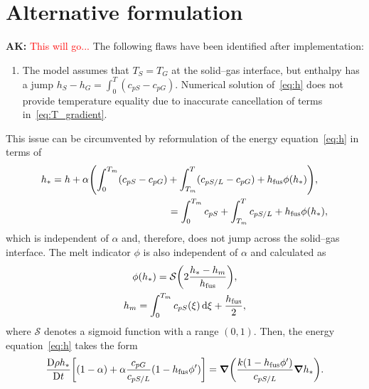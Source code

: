 \documentclass[final]{elsarticle} %
\newcommand\Dv[2][]{\frac{\mathrm{D}#1}{\mathrm{D}#2}}
\newcommand{\fusion}[1]{{#1}_\text{fus}}
\newcommand{\ak}[1] {\textbf{AK:} \textcolor{red}{#1}}
\begin{document}
\section{Alternative formulation}

\ak{This will go... } The following flaws have been identified after implementation:
\begin{enumerate}
    \item The model assumes that $T_S=T_G$ at the solid--gas interface,
    but enthalpy has a jump $h_S-h_G = \int_0^T (c_{pS}-c_{pG})$.
    Numerical solution of~\eqref{eq:h} does not provide temperature equality
    due to inaccurate cancellation of terms in~\eqref{eq:T_gradient}.
\end{enumerate}
This issue can be circumvented by reformulation of the energy equation~\eqref{eq:h} in terms of
\begin{equation}\label{eq:alt:h_star}
    \begin{multlined}
    h_* = h + \alpha\qty(\int_0^{T_m}(c_{pS}-c_{pG}) + \int_{T_m}^T (c_{pS/L}-c_{pG})
        + \fusion{h}\phi(h_*)), \\
    = \int_0^{T_m}c_{pS} + \int_{T_m}^T c_{pS/L} + \fusion{h}\phi(h_*),
    \end{multlined}
\end{equation}
which is independent of $\alpha$ and, therefore, does not jump across the solid--gas interface.
The melt indicator $\phi$ is also independent of $\alpha$ and calculated as
\begin{gather}
    \phi(h_*) = \mathcal{S}\qty(2\frac{h_*-h_m}{\fusion{h}}), \label{eq:alt:phi}\\
    h_m = \int_0^{T_m} c_{pS}(\xi)\dd{\xi} + \frac{\fusion{h}}2, \label{eq:h_m}
\end{gather}
where $\mathcal{S}$ denotes a sigmoid function with a range $(0,1)$.
Then, the energy equation~\eqref{eq:h} takes the form
\begin{equation}\label{eq:alt:h}
    \Dv[\rho h_*]{t}\qty[(1-\alpha) + \alpha\frac{c_{pG}}{c_{pS/L}}(1-\fusion{h}\phi') ]
        = \grad(\frac{k(1-\fusion{h}\phi')}{c_{pS/L}}\grad{h_*}).
\end{equation}



\end{document}

